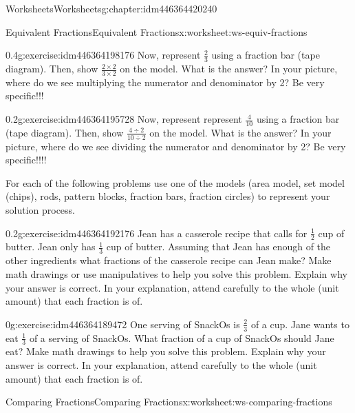 \documentclass[twoside,11pt,]{book}
\begin{document}
\begin{chapterptx}{Worksheets}{}{Worksheets}{}{}{g:chapter:idm446364420240}
\begin{worksheet-section-numberless}{Equivalent Fractions}{}{Equivalent Fractions}{}{}{x:worksheet:ws-equiv-fractions}
\begin{divisionexercise}{2}{}{0.4}{g:exercise:idm446364198176}%
Now, represent \(\frac{2}{3} \) using a fraction bar (tape diagram). Then, show  \(\frac{2 \times 2}{3 \times 2} \) on the model. What is the answer? In your picture, where do we see multiplying the numerator and denominator by 2? Be very specific!!!%
\end{divisionexercise}%
\begin{divisionexercise}{3}{}{0.2}{g:exercise:idm446364195728}%
Now, represent represent \(\frac{4}{10} \) using a fraction bar (tape diagram). Then, show  \(\frac{4 \div 2}{10 \div 2} \) on the model. What is the answer? In your picture, where do we see dividing the numerator and denominator by 2? Be very specific!!!!%
\end{divisionexercise}%
\begin{introduction}{}%
For each of the following problems use one of the models (area model, set model (chips), rods, pattern blocks, fraction bars, fraction circles) to represent your solution process.%
\end{introduction}%
\begin{divisionexercise}{4}{}{0.2}{g:exercise:idm446364192176}%
Jean has a casserole recipe that calls for \(\frac{1}{2} \) cup of butter. Jean only has \(\frac{1}{3} \) cup of butter. Assuming that Jean has enough of the other ingredients what fractions of the casserole recipe can Jean make? Make math drawings or use manipulatives to help you solve this problem. Explain why your answer is correct. In your explanation, attend carefully to the whole (unit amount) that each fraction is of.%
\end{divisionexercise}%
\begin{divisionexercise}{5}{}{0}{g:exercise:idm446364189472}%
One serving of SnackOs is \(\frac{2}{3} \) of a cup. Jane wants to eat \(\frac{1}{3} \) of a serving of SnackOs. What fraction of a cup of SnackOs should Jane eat? Make math drawings to help you solve this problem. Explain why your answer is correct. In your explanation, attend carefully to the whole (unit amount) that each fraction is of.%
\end{divisionexercise}%
\end{worksheet-section-numberless}
\restoregeometry
%
%
\typeout{************************************************}
\typeout{************************************************}
%
\begin{worksheet-section-numberless}{Comparing Fractions}{}{Comparing Fractions}{}{}{x:worksheet:ws-comparing-fractions}

\end{worksheet-section-numberless}
\end{chapterptx}
\end{document}
